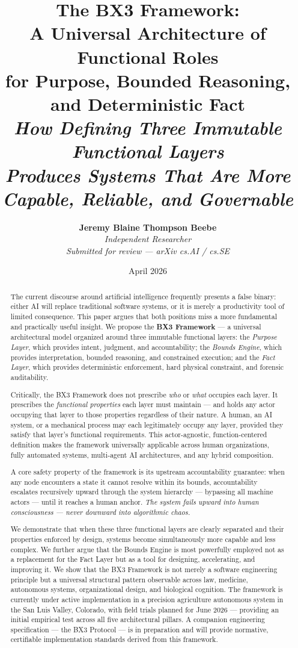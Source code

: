 \documentclass[12pt]{article}
\title{
    \vspace{-1cm}
    {\Large \textbf{The BX3 Framework:}}\\[0.4em]
    {\large A Universal Architecture of Functional Roles\\
    for Purpose, Bounded Reasoning, and Deterministic Fact}\\[1em]
    {\normalsize \textit{How Defining Three Immutable Functional Layers\\
    Produces Systems That Are More Capable, Reliable, and Governable}}
}
\author{
    \textbf{Jeremy Blaine Thompson Beebe}\\[0.2em]
    \textit{Independent Researcher}\\[0.3em]
    \textit{Submitted for review --- arXiv cs.AI / cs.SE}\\[0.3em]
}
\date{April 2026}
\begin{document}
\maketitle
\thispagestyle{fancy}

\begin{abstract}
\noindent
The current discourse around artificial intelligence frequently presents a false binary: either AI will replace traditional software systems, or it is merely a productivity tool of limited consequence. This paper argues that both positions miss a more fundamental and practically useful insight. We propose the \textbf{BX3 Framework} --- a universal architectural model organized around three immutable functional layers: the \textit{Purpose Layer}, which provides intent, judgment, and accountability; the \textit{Bounds Engine}, which provides interpretation, bounded reasoning, and constrained execution; and the \textit{Fact Layer}, which provides deterministic enforcement, hard physical constraint, and forensic auditability.

Critically, the BX3 Framework does not prescribe \textit{who} or \textit{what} occupies each layer. It prescribes the \textit{functional properties} each layer must maintain --- and holds any actor occupying that layer to those properties regardless of their nature. A human, an AI system, or a mechanical process may each legitimately occupy any layer, provided they satisfy that layer's functional requirements. This actor-agnostic, function-centered definition makes the framework universally applicable across human organizations, fully automated systems, multi-agent AI architectures, and any hybrid composition.

A core safety property of the framework is its upstream accountability guarantee: when any node encounters a state it cannot resolve within its bounds, accountability escalates recursively upward through the system hierarchy --- bypassing all machine actors --- until it reaches a human anchor. \textit{The system fails upward into human consciousness --- never downward into algorithmic chaos.}

We demonstrate that when these three functional layers are clearly separated and their properties enforced by design, systems become simultaneously more capable and less complex. We further argue that the Bounds Engine is most powerfully employed not as a replacement for the Fact Layer but as a tool for designing, accelerating, and improving it. We show that the BX3 Framework is not merely a software engineering principle but a universal structural pattern observable across law, medicine, autonomous systems, organizational design, and biological cognition. The framework is currently under active implementation in a precision agriculture autonomous system in the San Luis Valley, Colorado, with field trials planned for June 2026 --- providing an initial empirical test across all five architectural pillars. A companion engineering specification --- the BX3 Protocol --- is in preparation and will provide normative, certifiable implementation standards derived from this framework.


\end{abstract}
\end{document}
